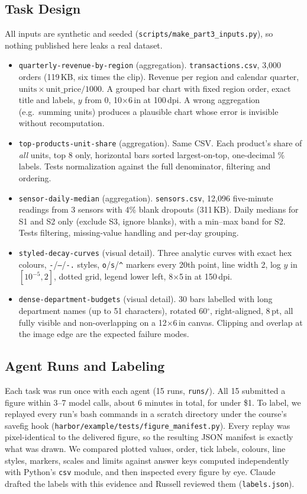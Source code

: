 \documentclass[11pt]{article}
\begin{document}
\subsection{Task Design}
All inputs are synthetic and seeded (\texttt{scripts/make\_part3\_inputs.py}),
so nothing published here leaks a real dataset.
\begin{itemize}
\item \texttt{quarterly-revenue-by-region} (aggregation). \texttt{transactions.csv},
3{,}000 orders (119\,KB, six times the clip). Revenue per region and calendar
quarter, $\text{units}\times\text{unit\_price}/1000$. A grouped bar chart with
fixed region order, exact title and labels, $y$ from 0, 10$\times$6\,in at 100\,dpi. A
wrong aggregation (e.g.\ summing units) produces a plausible chart whose error is
invisible without recomputation.
\item \texttt{top-products-unit-share} (aggregation). Same CSV. Each product's
share of \emph{all} units, top 8 only, horizontal bars sorted largest-on-top,
one-decimal \% labels. Tests normalization against the full denominator,
filtering and ordering.
\item \texttt{sensor-daily-median} (aggregation). \texttt{sensors.csv}, 12{,}096
five-minute readings from 3 sensors with 4\% blank dropouts (311\,KB).
Daily medians for S1 and S2 only (exclude S3, ignore blanks), with a
min--max band for S2. Tests filtering, missing-value handling and per-day
grouping.
\item \texttt{styled-decay-curves} (visual detail). Three analytic curves with
exact hex colours, \texttt{-}/\texttt{--}/\texttt{-.} styles, \texttt{o}/\texttt{s}/\texttt{\^{}}
markers every 20th point, line width 2, log $y$ in $[10^{-5},2]$, dotted grid,
legend lower left, 8$\times$5\,in at 150\,dpi.
\item \texttt{dense-department-budgets} (visual detail). 30 bars labelled with
long department names (up to 51 characters), rotated 60$^\circ$, right-aligned, 8\,pt,
all fully visible and non-overlapping on a 12$\times$6\,in canvas. Clipping and
overlap at the image edge are the expected failure modes.
\end{itemize}

\subsection{Agent Runs and Labeling}
Each task was run once with each agent (15 runs, \texttt{runs/}). All 15
submitted a figure within 3--7 model calls, about 6 minutes in total, for under
\$1. To label, we replayed every run's bash commands in a scratch directory
under the course's savefig hook (\texttt{harbor/example/tests/figure\_manifest.py}).
Every replay was pixel-identical to the delivered figure, so the resulting JSON
manifest is exactly what was drawn. We compared plotted values, order, tick
labels, colours, line styles, markers, scales and limits against answer keys
computed independently with Python's \texttt{csv} module, and then inspected
every figure by eye. Claude drafted the labels with this evidence and Russell
reviewed them (\texttt{labels.json}).
\end{document}
